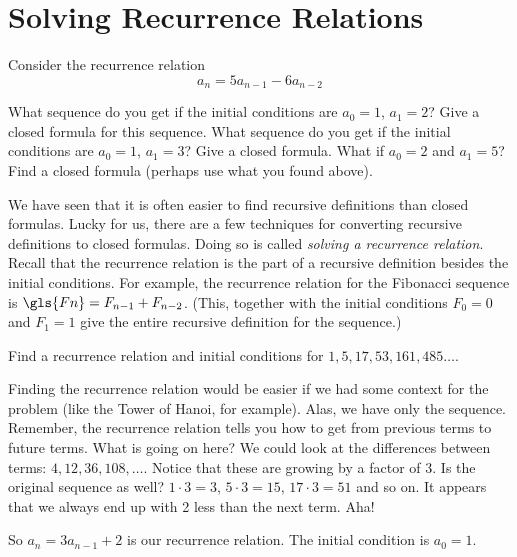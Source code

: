 \documentclass[12pt]{article}
\begin{document}
\section{Solving Recurrence Relations}

\begin{activity}
Consider the recurrence relation 
\[a_n = 5a_{n-1} - 6a_{n-2}\]

\begin{questions}
\question What sequence do you get if the initial conditions are $a_0 = 1$, $a_1 = 2$?  Give a closed formula for this sequence.
\question What sequence do you get if the initial conditions are $a_0 = 1$, $a_1 = 3$?  Give a closed formula.
\question What if $a_0 = 2$ and $a_1 = 5$?  Find a closed formula (perhaps use what you found above).
\end{questions}
\end{activity}

We have seen that it is often easier to find recursive definitions than closed formulas.  Lucky for us, there are a few techniques for converting recursive definitions to closed formulas.  Doing so is called \emph{solving a recurrence relation}.  Recall that the recurrence relation is the part of a recursive definition besides the initial conditions.  For example, the recurrence relation for the Fibonacci sequence is $\gls{Fn} = F_{n-1} + F_{n-2}$.  (This, together with the initial conditions $F_0 = 0$ and $F_1 = 1$ give the entire recursive definition for the sequence.)  
 
\begin{example}
  Find a recurrence relation and initial conditions for $1, 5, 17, 53, 161, 485\ldots$. 
  \begin{solution}
    Finding the recurrence relation would be easier if we had some context for the problem (like the Tower of Hanoi, for example).  Alas, we have only the sequence.  Remember, the recurrence relation tells you how to get from previous terms to future terms.  What is going on here?  We could look at the differences between terms: $4, 12, 36, 108, \ldots$.  Notice that these are growing by a factor of 3.  Is the original sequence as well?  $1\cdot 3 = 3$, $5 \cdot 3 = 15$, $17 \cdot 3 = 51$ and so on.  It appears that we always end up with 2 less than the next term.  Aha!  
    
    So $a_n = 3a_{n-1} + 2$ is our recurrence relation.  The initial condition is $a_0 = 1$.
  \end{solution}

\end{example}
\end{document}
